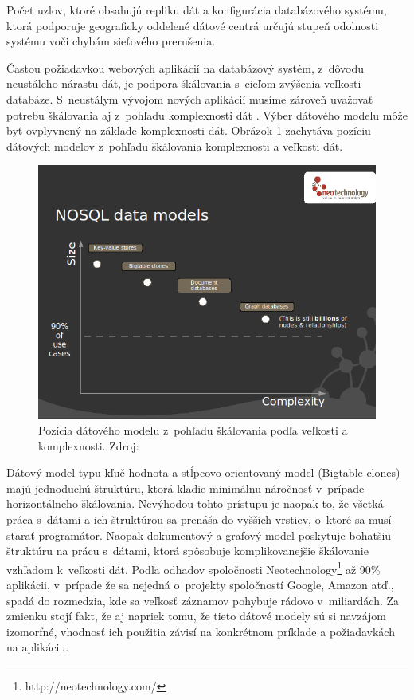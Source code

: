 \documentclass[11pt,twoside,a4paper]{book}
\begin{document}
Počet uzlov, ktoré obsahujú repliku dát a konfigurácia databázového systému, ktorá podporuje geograficky oddelené dátové centrá určujú stupeň odolnosti systému voči chybám sieťového prerušenia.

Častou požiadavkou webových aplikácií na databázový systém, z~dôvodu neustáleho nárastu dát, je podpora škálovania s~cieľom zvýšenia veľkosti databáze. S~neustálym vývojom nových aplikácií musíme zároveň uvažovať potrebu škálovania aj z~pohľadu komplexnosti dát \cite{segaran2009beautiful}. Výber dátového modelu môže byť ovplyvnený na základe komplexnosti dát. Obrázok \ref{fig:scalling} zachytáva pozíciu dátových modelov z~pohľadu škálovania komplexnosti a veľkosti dát.


\begin{figure}[h]
 \centering
 \includegraphics[width=13cm]{./figures/nosqldatamodels.png}
 \caption{Pozícia dátového modelu z~pohľadu škálovania podľa veľkosti a komplexnosti. Zdroj: \cite{neo4j}}
 \label{fig:scalling}
\end{figure}

Dátový model typu kľuč-hodnota a stĺpcovo orientovaný model (Bigtable clones) majú jednoduchú štruktúru, ktorá kladie minimálnu náročnosť v~prípade horizontálneho škálovania. Nevýhodou tohto prístupu je naopak to, že všetká práca s~dátami a ich štruktúrou sa prenáša do vyšších vrstiev, o~ktoré sa musí starať programátor. Naopak dokumentový a grafový model poskytuje bohatšiu štruktúru na prácu s~dátami, ktorá spôsobuje komplikovanejšie škálovanie vzhľadom k~veľkosti dát. Podľa odhadov spoločnosti Neotechnology\footnote{http://neotechnology.com/} až 90\% aplikácii, v~prípade že sa nejedná o~projekty spoločností Google, Amazon atď., spadá do rozmedzia, kde sa veľkosť záznamov pohybuje rádovo v~miliardách. Za zmienku stojí fakt, že aj napriek tomu, že tieto dátové modely sú si navzájom izomorfné, vhodnosť ich použitia závisí na konkrétnom príklade a požiadavkách na aplikáciu. 
\end{document}
